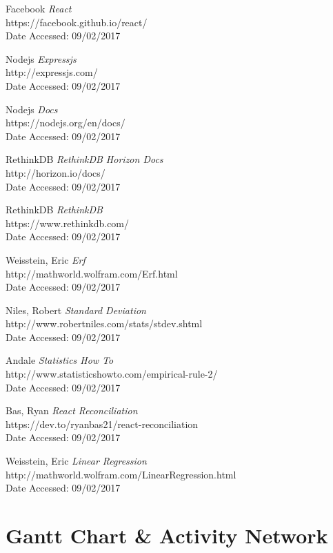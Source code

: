\documentclass[11pt, oneside, a4paper]{article}
\begin{document}
\newpage
\begin{thebibliography}
	\item Facebook {\em React} \\
	https://facebook.github.io/react/ \\
	Date Accessed: 09/02/2017
	\item Nodejs {\em Expressjs} \\
	http://expressjs.com/ \\
	Date Accessed: 09/02/2017
	\item Nodejs {\em Docs} \\
	https://nodejs.org/en/docs/ \\
	Date Accessed: 09/02/2017
	\item RethinkDB {\em RethinkDB Horizon Docs} \\
	http://horizon.io/docs/ \\
	Date Accessed: 09/02/2017
	\item RethinkDB {\em RethinkDB} \\
	https://www.rethinkdb.com/ \\
	Date Accessed: 09/02/2017
	\item Weisstein, Eric {\em Erf} \\
 	http://mathworld.wolfram.com/Erf.html\\
	Date Accessed: 09/02/2017
	\item Niles, Robert {\em Standard Deviation} \\
	http://www.robertniles.com/stats/stdev.shtml \\
	Date Accessed: 09/02/2017
	\item Andale {\em Statistics How To} \\
	http://www.statisticshowto.com/empirical-rule-2/ \\
	Date Accessed: 09/02/2017
	\item Bas, Ryan {\em React Reconciliation} \\
	https://dev.to/ryanbas21/react-reconciliation \\
	Date Accessed: 09/02/2017
	\item Weisstein, Eric {\em Linear Regression} \\
	http://mathworld.wolfram.com/LinearRegression.html \\
	Date Accessed: 09/02/2017
\end{thebibliography}

\newpage
\appendix
\section{Gantt Chart & Activity Network}
\end{document}
